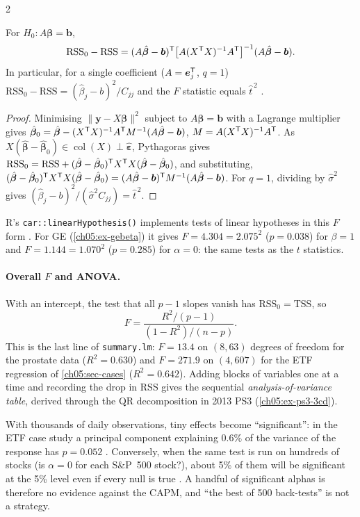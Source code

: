 \begin{paracol}{2}
\begin{proposition}[Wald form; $t^2=F$]\label{ch05:prop-wald}
For $H_0:A\bm\beta=\bm b$,
\[
  \text{RSS}_0-\text{RSS}=(A\hat{\bm\beta}-\bm b)^{\mathsf T}\bigl[A(X^{\mathsf T} X)^{-1}A^{\mathsf T}\bigr]^{-1}(A\hat{\bm\beta}-\bm b).
\]
In particular, for a single coefficient ($A=\bm e_j^{\mathsf T}$, $q=1$) $\text{RSS}_0-\text{RSS}=(\hat\beta_j-b)^2/C_{jj}$ and the $F$ statistic
equals $\hat t^{\,2}$ .
\end{proposition}
\begin{proof}
Minimising $\|\bm y-X\bm\beta\|^2$ subject to $A\bm\beta=\bm b$ with a Lagrange multiplier gives
$\hat{\bm\beta}_0=\hat{\bm\beta}-(X^{\mathsf T} X)^{-1}A^{\mathsf T} M^{-1}(A\hat{\bm\beta}-\bm b)$, $M=A(X^{\mathsf T} X)^{-1}A^{\mathsf T}$. As $X(\hat{\bm\beta}-\hat{\bm\beta}_0)\in\operatorname{col}(X)\perp\hat{\bm\varepsilon}$,
Pythagoras gives $\text{RSS}_0=\text{RSS}+(\hat{\bm\beta}-\hat{\bm\beta}_0)^{\mathsf T} X^{\mathsf T} X(\hat{\bm\beta}-\hat{\bm\beta}_0)$, and substituting,
$(\hat{\bm\beta}-\hat{\bm\beta}_0)^{\mathsf T} X^{\mathsf T} X(\hat{\bm\beta}-\hat{\bm\beta}_0)=(A\hat{\bm\beta}-\bm b)^{\mathsf T} M^{-1}(A\hat{\bm\beta}-\bm b)$. For $q=1$, dividing by $\hat\sigma^2$ gives
$(\hat\beta_j-b)^2/(\hat\sigma^2C_{jj})=\hat t^{\,2}$.
\end{proof}
R's \texttt{car::linearHypothesis()} implements tests of linear hypotheses in this $F$ form .
For GE (\cref{ch05:ex-gebeta}) it gives $F=4.304=2.075^2$ ($p=0.038$) for $\beta=1$ and $F=1.144=1.070^2$ ($p=0.285$) for
$\alpha=0$: the same tests as the $t$ statistics.

\paragraph{Overall $F$ and ANOVA.} With an intercept, the test that all $p-1$ slopes vanish has
$\text{RSS}_0=\text{TSS}$, so
\[
  F=\frac{R^2/(p-1)}{(1-R^2)/(n-p)} .
\]
This is the last line of \texttt{summary.lm}: $F=13.4$ on $(8,63)$ degrees of freedom for the prostate data
($R^2=0.630$) and $F=271.9$ on $(4,607)$ for the ETF regression of \cref{ch05:sec-cases} ($R^2=0.642$). Adding
blocks of variables one at a time and recording the drop in RSS gives the sequential \emph{analysis-of-variance
table}, derived through the QR decomposition in 2013 PS3 (\cref{ch05:ex-ps3-3cd}).

\begin{finance}
With thousands of daily observations, tiny effects become ``significant'': in the ETF case study a principal
component explaining $0.6\%$ of the variance of the response has $p=0.052$ . Conversely, when the
same test is run on hundreds of stocks (is $\alpha=0$ for each S\&P~500 stock?), about 5\% of them will be
significant at the 5\% level even if every null is true . A handful of significant alphas is
therefore no evidence against the CAPM, and ``the best of 500 back-tests'' is not a strategy.
\end{finance}


\end{paracol}
